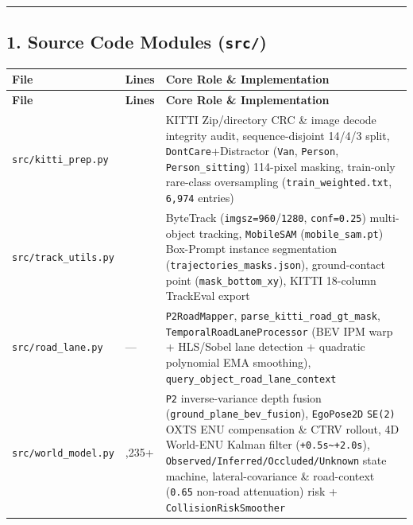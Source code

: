 \documentclass[10.5pt,a4paper]{article}
\begin{document}
\par\noindent\rule{\textwidth}{0.4pt}\par\medskip

\subsection{1. Source Code Modules (\texttt{src/\allowbreak{}})}


\begin{footnotesize}
\setlength{\tabcolsep}{4pt}
\setlength{\LTleft}{0pt}\setlength{\LTright}{0pt}
\begin{longtable}{>{\raggedright\arraybackslash}p{} >{\raggedright\arraybackslash}p{} >{\raggedright\arraybackslash}p{}}
\toprule
\textbf{File} & \textbf{Lines} & \textbf{Core Role \& Implementation} \\
\midrule
\endfirsthead
\toprule
\textbf{File} & \textbf{Lines} & \textbf{Core Role \& Implementation} \\
\midrule
\endhead
\bottomrule
\endfoot
\texttt{src/\allowbreak{}kitti\_\allowbreak{}prep.\allowbreak{}py} & 624 & KITTI Zip/directory CRC \& image decode integrity audit, sequence-disjoint 14/4/3 split, \texttt{DontCare}+Distractor (\texttt{Van}, \texttt{Person}, \texttt{Person\_\allowbreak{}sitting}) 114-pixel masking, train-only rare-class oversampling (\texttt{train\_\allowbreak{}weighted.\allowbreak{}txt}, \texttt{6,\allowbreak{}974} entries) \\
\texttt{src/\allowbreak{}track\_\allowbreak{}utils.\allowbreak{}py} & 620 & ByteTrack (\texttt{imgsz=960}/\texttt{1280}, \texttt{conf=0.\allowbreak{}25}) multi-object tracking, \texttt{MobileSAM} (\texttt{mobile\_\allowbreak{}sam.\allowbreak{}pt}) Box-Prompt instance segmentation (\texttt{trajectories\_\allowbreak{}masks.\allowbreak{}json}), ground-contact point (\texttt{mask\_\allowbreak{}bottom\_\allowbreak{}xy}), KITTI 18-column TrackEval export \\
\texttt{src/\allowbreak{}road\_\allowbreak{}lane.\allowbreak{}py} & --- & \texttt{P2RoadMapper}, \texttt{parse\_\allowbreak{}kitti\_\allowbreak{}road\_\allowbreak{}gt\_\allowbreak{}mask}, \texttt{TemporalRoadLaneProcessor} (BEV IPM warp + HLS/Sobel lane detection + quadratic polynomial EMA smoothing), \texttt{query\_\allowbreak{}object\_\allowbreak{}road\_\allowbreak{}lane\_\allowbreak{}context} \\
\texttt{src/\allowbreak{}world\_\allowbreak{}model.\allowbreak{}py} & 1,235+ & \texttt{P2} inverse-variance depth fusion (\texttt{ground\_\allowbreak{}plane\_\allowbreak{}bev\_\allowbreak{}fusion}), \texttt{EgoPose2D} \texttt{SE(2)} OXTS ENU compensation \& CTRV rollout, 4D World-ENU Kalman filter (\texttt{+0.\allowbreak{}5s\textasciitilde{}+2.\allowbreak{}0s}), \texttt{Observed/\allowbreak{}Inferred/\allowbreak{}Occluded/\allowbreak{}Unknown} state machine, lateral-covariance \& road-context (\texttt{0.\allowbreak{}65} non-road attenuation) risk + \texttt{CollisionRiskSmoother} \\

\end{longtable}
\end{footnotesize}
\end{document}
